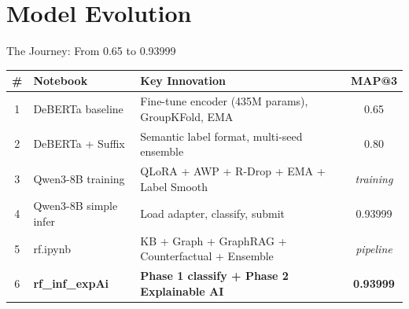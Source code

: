 ﻿\documentclass[aspectratio=169,10pt]{beamer}
\begin{document}
\section{Model Evolution}

\begin{frame}{The Journey: From 0.65 to 0.93999}
\small
\setlength{\tabcolsep}{4pt}
\renewcommand{\arraystretch}{1.3}
\begin{center}
\begin{tabular}{clp{5.2cm}c}
\toprule
\textbf{\#} & \textbf{Notebook} & \textbf{Key Innovation} & \textbf{MAP@3}\\
\midrule
\rowcolor{RowTintA}
1 & DeBERTa baseline & Fine-tune encoder (435M params), GroupKFold, EMA & 0.65\\
\rowcolor{RowTintB}
2 & DeBERTa + Suffix & Semantic label format, multi-seed ensemble & 0.80\\
\rowcolor{RowTintA}
3 & Qwen3-8B training & QLoRA + AWP + R-Drop + EMA + Label Smooth & \textit{training}\\
\rowcolor{RowTintB}
4 & Qwen3-8B simple infer & Load adapter, classify, submit & 0.93999\\
\rowcolor{LightBlue}
5 & rf.ipynb & KB + Graph + GraphRAG + Counterfactual + Ensemble & \textit{pipeline}\\
\rowcolor{LightGreen}
6 & \textbf{rf\_inf\_expAi} & \textbf{Phase 1 classify + Phase 2 Explainable AI} & \textbf{0.93999}\\
\bottomrule
\end{tabular}
\end{center}
\vspace{6pt}
\begin{center}
\end{center}
\end{frame}
\end{document}
